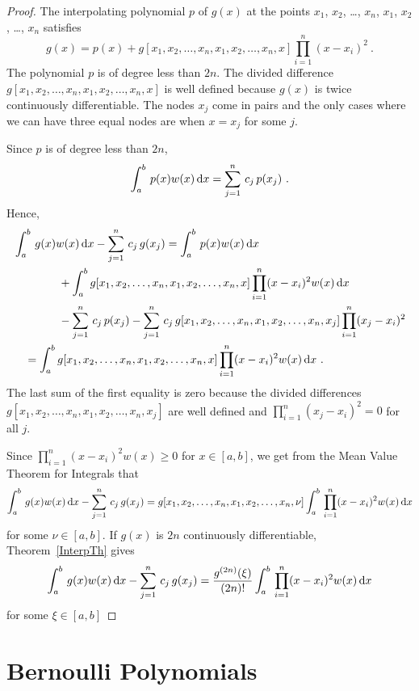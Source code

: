 \begin{proof}
The interpolating polynomial $p$ of $g(x)$ at the points $x_1$, $x_2$,
\ldots, $x_n$, $x_1$, $x_2$, \ldots, $x_n$ satisfies
\[
g(x) = p(x) + g[x_1,x_2,\ldots,x_n,x_1,x_2,\ldots,x_n,x]
\prod_{i=1}^n (x-x_i)^2 \ .
\]
The polynomial $p$ is of degree less than $2n$.  The
divided difference \\
$g[x_1,x_2,\ldots,x_n,x_1,x_2,\ldots,x_n,x]$
is well defined because $g(x)$ is twice continuously differentiable.
The nodes $x_j$ come in pairs and the only cases where we can have
three equal nodes are when $x=x_j$ for some $j$.

Since $p$ is of degree less than $2n$,
\[
\int_a^b \,p(x) w(x)\,\mathrm{d}x = \sum_{j=1}^n \, c_j \, p(x_j) \ .
\]
Hence,
\begin{align*}
& \int_a^b \,g(x) w(x)\,\mathrm{d}x - \sum_{j=1}^n \, c_j \, g(x_j) = 
 \int_a^b \,p(x) w(x)\,\mathrm{d}x \\
& \qquad\qquad + \int_a^b g[x_1,x_2,\ldots,x_n,x_1,x_2,\ldots,x_n,x]
\prod_{i=1}^n (x-x_i)^2 w(x)\,\mathrm{d}x \\
&\qquad\qquad - \sum_{j=1}^n \, c_j \, p(x_j)
- \sum_{j=1}^n \, c_j \, g[x_1,x_2,\ldots,x_n,x_1,x_2,\ldots,x_n,x_j]
\prod_{i=1}^n (x_j-x_i)^2 \\
&\quad = \int_a^b g[x_1,x_2,\ldots,x_n,x_1,x_2,\ldots,x_n,x]
\prod_{i=1}^n (x-x_i)^2 w(x)\,\mathrm{d}x \ .
\end{align*}
The last sum of the first equality is zero because the divided
differences \\
$\displaystyle g[x_1,x_2,\ldots,x_n,x_1,x_2,\ldots,x_n,x_j]$
are well defined and
$\displaystyle \prod_{i=1}^n (x_j-x_i)^2 = 0$ for all $j$.

Since $\displaystyle \prod_{i=1}^n (x-x_i)^2 w(x) \geq 0$ for
$x \in [a,b]$, we get from the Mean Value Theorem for
Integrals that
\[
\int_a^b \,g(x) w(x)\,\mathrm{d}x - \sum_{j=1}^n \, c_j \, g(x_j) =
g[x_1,x_2,\ldots,x_n,x_1,x_2,\ldots,x_n,\nu] \int_a^b\, 
\prod_{i=1}^n (x-x_i)^2 w(x)\,\mathrm{d}x
\]
for some $\nu \in [a,b]$.  If $g(x)$ is $2n$ continuously
differentiable, Theorem~\ref{InterpTh} gives
\[
\int_a^b \,g(x) w(x)\,\mathrm{d}x - \sum_{j=1}^n \, c_j \, g(x_j) =
\frac{g^{(2n)}(\xi)}{(2n)!} \int_a^b\, 
\prod_{i=1}^n (x-x_i)^2 w(x)\,\mathrm{d}x
\]
for some $\xi \in [a,b]$
\end{proof}

\section{Bernoulli Polynomials}\label{BernPoly}

